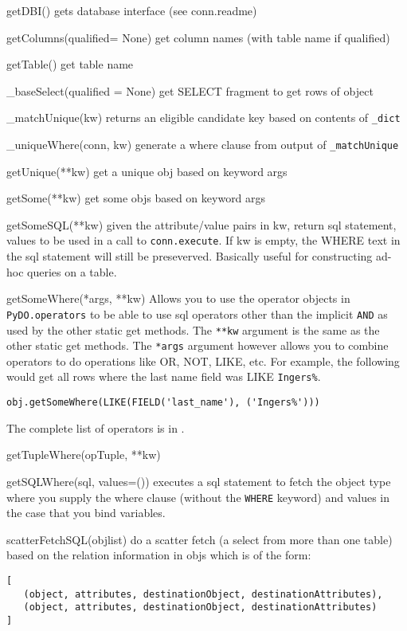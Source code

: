 \documentclass[titlepage]{manual}
\begin{document}
\begin{argdesc}
\item[getDBI()] gets database interface (see conn.readme)
\item[getColumns(qualified= None)] get column names (with table name
if qualified)
\item[getTable()] get table name
\item[_baseSelect(qualified = None)] get SELECT fragment to get rows
of object
\item[_matchUnique(kw)] returns an eligible candidate key based on
contents of \texttt{\_dict}
\item[_uniqueWhere(conn, kw)] generate a where clause from output of
\texttt{\_matchUnique}
\item[getUnique(**kw)] get a unique obj based on keyword args
\item[getSome(**kw)] get some objs based on keyword args
\item[getSomeSQL(**kw)] given the attribute/value pairs in kw, return
sql statement, values to be used in a call to \texttt{conn.execute}.
If kw is empty, the WHERE text in the sql statement will still be
preseverved.  Basically useful for constructing ad-hoc queries on a
table.
\item[getSomeWhere(*args, **kw)] Allows you to use the operator
objects in \texttt{PyDO.operators} to be able to use sql operators
other than the implicit \texttt{AND} as used by the other static get
methods.  The \texttt{**kw} argument is the same as the other static
get methods.  The \texttt{*args} argument however allows you to
combine operators to do operations like OR, NOT, LIKE, etc.  For
example, the following would get all rows where the last name field
was LIKE \texttt{Ingers\%}.
\begin{verbatim}
obj.getSomeWhere(LIKE(FIELD('last_name'), ('Ingers%')))
\end{verbatim}

The complete list of operators is in .
\item[getTupleWhere(opTuple, **kw)]

\item[getSQLWhere(sql, values=())] executes a sql statement to fetch
the object type where you supply the where clause (without the
\texttt{WHERE} keyword) and values in the case that you bind
variables.

\item[scatterFetchSQL(objlist)] do a scatter fetch (a select from more than one table) based
        on the relation information in objs which is of the form:
\begin{verbatim}
[
   (object, attributes, destinationObject, destinationAttributes),
   (object, attributes, destinationObject, destinationAttributes)
]
\end{verbatim}


\end{argdesc}
\end{document}
